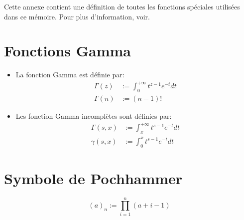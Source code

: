 {}



\label{special_functions}

Cette annexe contient une définition de toutes les fonctions spéciales utilisées dans ce mémoire. Pour plus d'information, voir\cite{NIST:DLMF}.
\section*{Fonctions Gamma}
\begin{itemize}
    \item La fonction Gamma est définie par:
    \[
        \begin{aligned}
            \Gamma(z)&:=\int_0^{+\infty}t^{z-1}e^{-t}dt \\
            \Gamma(n)&:=(n-1)!
        \end{aligned}
    \]
    \item Les fonction Gamma incomplètes sont définies par:
    \[
    \begin{aligned}
        \Gamma(s,x)&:=\int_x^{+\infty}t^{s-1}e^{-t}dt \\
        \gamma(s,x)&:=\int_0^x t^{s-1}e^{-t}dt
    \end{aligned}
    \] 
\end{itemize}

\section*{Symbole de Pochhammer}
\[
{(a)}_n:=\prod_{i=1}^n (a+i-1)
\]

